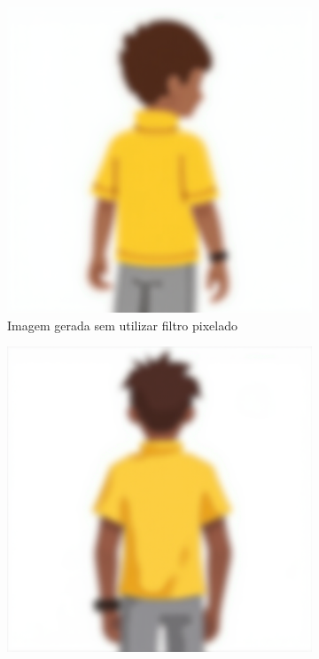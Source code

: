 \begin{figure}[htbp]
    \centering
    \caption{\small Comparativo de resultados do modelo Flux com e sem filtro pixelizado}
    \label{fig:cgDreamPersonagemPadraoFluxEstilo}
    \begin{subfigure}{0.45\linewidth}
        \includegraphics[width=1\linewidth]{figs/cgDream/res_char_FluxFast_estilo1.png}
        \caption{\small Imagem gerada sem utilizar filtro pixelado}
        \label{fig:CGDreamFluxEstiloSemFiltro}
    \end{subfigure}
    \begin{subfigure}{0.45\linewidth}
        \includegraphics[width=1\linewidth]{figs/cgDream/res_char_FluxFast_filtro1.png}

\end{subfigure}
\end{figure}
